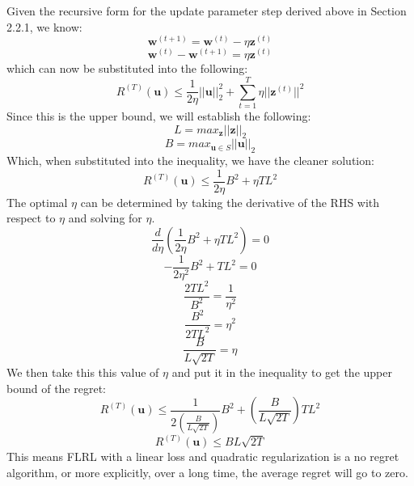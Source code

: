 \documentclass[11pt]{article}
\begin{document}
Given the recursive form for the update parameter step derived above in Section 2.2.1, we know:
\begin{equation*}
\bm{w}^{(t+1)} = \bm{w}^{(t)} - \eta\bm{z}^{(t)}
\end{equation*}
\begin{equation*}
\bm{w}^{(t)} - \bm{w}^{(t+1)} = \eta\bm{z}^{(t)}
\end{equation*}
which can now be substituted into the following:
\begin{equation*}
R^{(T)}(\bm{u}) \leq \frac{1}{2\eta}||\bm{u}||^2_2 + \sum^{T}_{t=1}\eta||\bm{z}^{(t)}||^2
 \end{equation*}
Since this is the upper bound, we will establish the following:
\begin{equation*}
L = max_{\bm{z}}||\bm{z}||_2
\end{equation*}
\begin{equation*}
B = max_{\bm{u} \in S}||\bm{u}||_2
\end{equation*}
Which, when substituted into the inequality, we have the cleaner solution:
\begin{equation*}
R^{(T)}(\bm{u}) \leq \frac{1}{2\eta}B^2 + \eta TL^2
\end{equation*}
The optimal $\eta$ can be determined by taking the derivative of the RHS with respect to $\eta$ and solving for $\eta$.
\begin{equation*}
\frac{d}{d\eta}( \frac{1}{2\eta}B^2 + \eta TL^2) = 0
\end{equation*}
\begin{equation*}
-\frac{1}{2\eta^2}B^2 + TL^2 = 0
\end{equation*}
\begin{equation*}
\frac{2TL^2}{B^2}  = \frac{1}{\eta^2}
\end{equation*}
\begin{equation*}
\frac{B^2}{2TL^2}  = \eta^2
\end{equation*}
\begin{equation*}
\frac{B}{L\sqrt{2T}}  = \eta
\end{equation*}
We then take this this value of $\eta$ and put it in the inequality to get the upper bound of the regret:
\begin{equation*}
R^{(T)}(\bm{u}) \leq \frac{1}{2(\frac{B}{L\sqrt{2T}})}B^2 +  (\frac{B}{L\sqrt{2T}}) TL^2
\end{equation*}
\begin{equation*}
R^{(T)}(\bm{u}) \leq BL\sqrt{2T}
\end{equation*}
This means FLRL with a linear loss and quadratic regularization is a no regret algorithm, or more explicitly,  over a long time, the average regret will go to zero.
\end{document}
